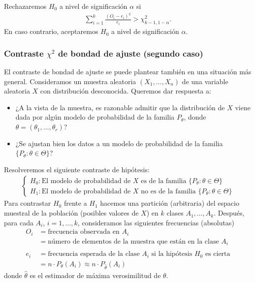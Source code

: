 Rechazaremos $H_0$ a nivel de significación $\alpha$ si
\begin{align*}
    \sum_{i=1}^{k} \frac{(O_i - e_i)^2}{e_i} > \chi^2_{k-1, 1 - \alpha}.
\end{align*}
En caso contrario, aceptaremos $H_0$ a nivel de significación $\alpha$.

\subsubsection{Contraste $\chi^2$ de bondad de ajuste (segundo caso)}

El contraste de bondad de ajuste se puede plantear también en una situación más general. Consideramos un muestra aleatoria $(X_1,\ldots, X_n)$ de una variable aleatoria $X$ con distribución desconocida. Queremos dar respuesta a:
\begin{itemize}
    \item ¿A la vista de la muestra, es razonable admitir que la distribución de $X$ viene dada por algún modelo de probabilidad de la familia $P_{\theta}$, donde $\theta = (\theta_1,\ldots,\theta_r)$?
    \item ¿Se ajustan bien los datos a un modelo de probabilidad de la familia $\{P_{\theta} : \theta \in \Theta\}$?
\end{itemize}
Resolveremos el siguiente contraste de hipótesis:
\begin{align*}
    \begin{cases}
        H_0 : \text{El modelo de probabilidad de $X$ es de la familia $\{P_{\theta} : \theta \in \Theta\}$} \\
        H_1 : \text{El modelo de probabilidad de $X$ no es de la familia $\{P_{\theta} : \theta \in \Theta\}$}
    \end{cases}
\end{align*}
Para contrastar $H_0$ frente a $H_1$ hacemos una partición (arbitraria) del espacio muestral de la población (posibles valores de $X$) en $k$ clases $A_1, \ldots, A_k$. Después, para cada $A_i$, $i=1,\ldots,k$, consideramos las siguientes frecuencias (absolutas)
\begin{align*}
    O_i & = \text{frecuencia observada en $A_i$}                                         \\
        & = \text{número de elementos de la muestra que están en la clase $A_i$}         \\ \\
    e_i & = \text{frecuencia esperada de la clase $A_i$ si la hipótesis $H_0$ es cierta} \\
        & = n \cdot P_{\theta}(A_i) \approx n \cdot P_{\widehat{\theta}}(A_i)
\end{align*}
donde $\widehat{\theta}$ es el estimador de máxima verosimilitud de $\theta$.

